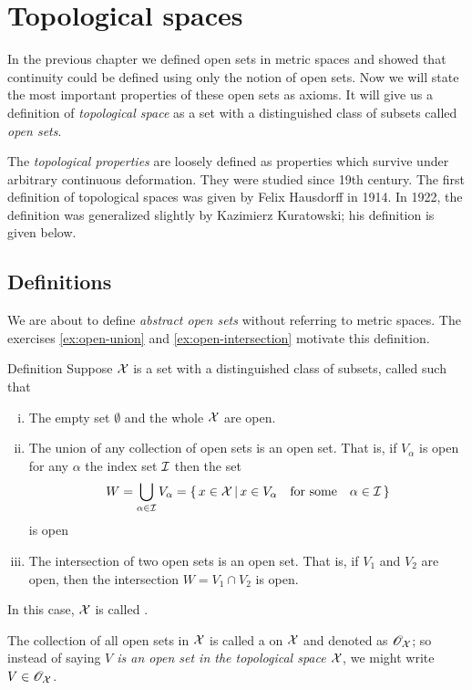 \chapter{Topological spaces}


In the previous chapter we defined open sets in metric spaces 
and showed that continuity could be defined using only the notion of open sets.
Now we will state the most important properties of these open sets as axioms.
It will give us a definition of \emph{topological space} as a set with a distinguished class of subsets called \emph{open sets}.

The \emph{topological properties} are loosely defined as properties which survive under arbitrary continuous deformation.
They were studied since 19th century.
The first definition of topological spaces was given by Felix Hausdorff in 1914.
In 1922, the definition was generalized slightly by Kazimierz Kuratowski; his definition is given below.

\section{Definitions}

We are about to define \emph{abstract open sets} without referring to metric spaces.
The exercises \ref{ex:open-union} and \ref{ex:open-intersection} motivate this definition.

\begin{thm}{Definition}\label{def:top-space}
Suppose $\mathcal{X}$ is a set 
with a distinguished class of subsets, called  such that
\begin{enumerate}[(i)] 
\item\label{def:top-space:empty} The empty set $\emptyset$ and the whole $\mathcal{X}$ are open.
\item\label{def:top-space:u} The union of any collection of open sets is an open set.
That is, if $V_\alpha$ is open for any $\alpha$ the index set $\mathcal{I}$ 
then the set
\[W=\bigcup_{\alpha\in \mathcal{I}} V_\alpha
=
\left\{\,{x\in \mathcal{X}}\,\middle|\,{x\in V_\alpha\quad\text{for some}\quad\alpha\in \mathcal{I}}\,\right\}\]
is open
\item\label{def:top-space:n} The intersection of two open sets is an open set.  
That is, if $V_1$ and $V_2$ are open, then the intersection $W=V_1 \cap V_2$ is open. 
\end{enumerate}
In this case, $\mathcal{X}$ is called .

The collection of all open sets in  $\mathcal{X}$ is called a  on $\mathcal{X}$ and denoted as $\mathscr{O}_{\mathcal{X}}$;
so instead of saying \emph{$V$ is an open set in the topological space $\mathcal{X}$}, we might write $V\in \mathscr{O}_{\mathcal{X}}$.
\end{thm}

